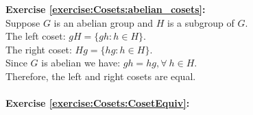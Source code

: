 \noindent\textbf{Exercise \ref{exercise:Cosets:abelian_cosets}:}
\\
Suppose $G$ is an abelian group and $H$ is a subgroup of $G$.
\\
The left coset: $gH = \{gh: h \in H\}$.
\\
The right coset: $Hg = \{hg: h \in H\}$.
\\
Since $G$ is abelian we have: $gh = hg, \forall \  h \in H$.
\\
Therefore, the left and right cosets are equal.
\\
\\
\textbf{Exercise \ref{exercise:Cosets:CosetEquiv}:}
%
%
%
%
